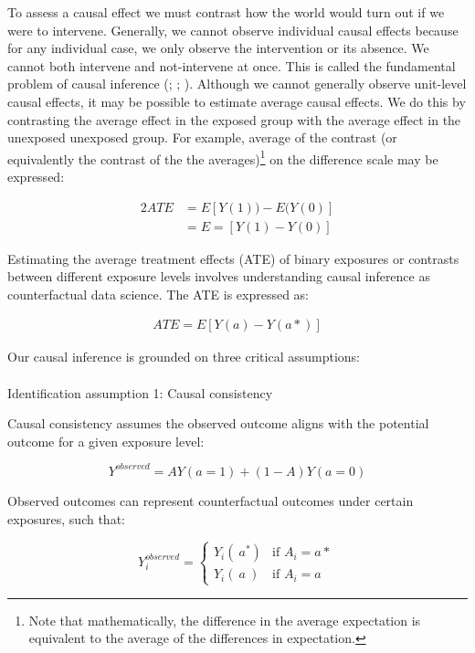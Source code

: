 \documentclass[
  singlecolumn,
  9pt]{article}
\makeatletter
\let\oldparagraph\paragraph
\renewcommand{\paragraph}{
    \@ifstar
      \xxxParagraphStar
      \xxxParagraphNoStar
  }
\newcommand{\xxxParagraphStar}[1]{\oldparagraph*{#1}\mbox{}}
\newcommand{\xxxParagraphNoStar}[1]{\oldparagraph{#1}\mbox{}}
\makeatother
\begin{document}
To assess a causal effect we must contrast how the world would turn out
if we were to intervene. Generally, we cannot observe individual causal
effects because for any individual case, we only observe the
intervention or its absence. We cannot both intervene and not-intervene
at once. This is called the fundamental problem of causal inference
(;
; ). Although we cannot generally observe unit-level causal effects,
it may be possible to estimate average causal effects. We do this by
contrasting the average effect in the exposed group with the average
effect in the unexposed unexposed group. For example, average of the
contrast (or equivalently the contrast of the the averages)\footnote{Note
  that mathematically, the difference in the average expectation is
  equivalent to the average of the differences in expectation.} on the
difference scale may be expressed:

\begin{alignat*}{2}
ATE & = E[Y(1)) - E(Y(0)]\\
& = E=[Y(1) - Y(0)]
\end{alignat*}

Estimating the average treatment effects (ATE) of binary exposures or
contrasts between different exposure levels involves understanding
causal inference as counterfactual data science. The ATE is expressed
as:

   \begin{align*}
    ATE = E[Y(a) - Y(a*)]
    \end{align*}

Our causal inference is grounded on three critical assumptions:

\paragraph{Identification assumption 1: Causal
consistency}\label{identification-assumption-1-causal-consistency}

Causal consistency assumes the observed outcome aligns with the
potential outcome for a given exposure level:

\[Y^{observed} = AY(a=1) + (1-A)Y(a=0)\]

Observed outcomes can represent counterfactual outcomes under certain
exposures, such that:

\[
Y^{observed}_i = 
\begin{cases} 
Y_i(~a^*) & \text{if } A_i = a* \\
Y_i(~a~) & \text{if } A_i = a
\end{cases}
\]
\end{document}
